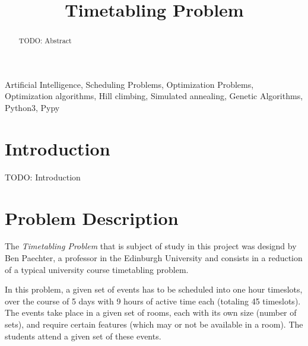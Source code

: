 \documentclass[conference]{IEEEtran}
\begin{document}
\title{Timetabling Problem}

\author{
\and
{}
\and
{}
}

\maketitle

\begin{abstract}
TODO: Abstract
\end{abstract}

\begin{IEEEkeywords}
Artificial Intelligence, Scheduling Problems, Optimization Problems, Optimization algorithms, Hill climbing, Simulated annealing, Genetic Algorithms, Python3, Pypy
\end{IEEEkeywords}

\section{Introduction}

TODO: Introduction

\section{Problem Description}

The \textit{Timetabling Problem} that is subject of study in this project was designd by Ben Paechter, a professor in the Edinburgh University and consists in a reduction of a typical university course timetabling problem.

In this problem, a given set of events has to be scheduled into one hour timeslots, over the course of 5 days with 9 hours of active time each (totaling 45 timeslots). The events take place in a given set of rooms, each with its own size (number of sets), and require certain features (which may or not be available in a room). The students attend a given set of these events. 
\end{document}
